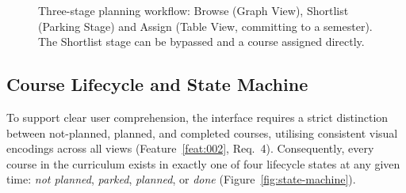 \begin{figure}[htbp]
\caption{Three-stage planning workflow: Browse (Graph View), Shortlist (Parking Stage) and Assign (Table View, committing to a semester). The Shortlist stage can be bypassed and a course assigned directly.}
\label{fig:workflow}
\end{figure}

\subsection{Course Lifecycle and State Machine}
\label{sec:lifecycle}

To support clear user comprehension, the interface requires a strict distinction between not-planned, planned, and completed courses, utilising consistent visual encodings across all views (Feature~\ref{feat:002}, Req.~4). Consequently, every course in the curriculum exists in exactly one of four lifecycle states at any given time: \emph{not planned}, \emph{parked}, \emph{planned}, or \emph{done} (Figure~\ref{fig:state-machine}).

